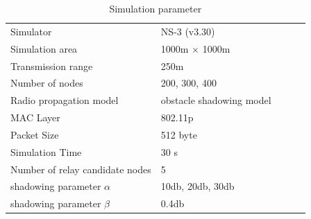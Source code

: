 \documentclass[conference]{IEEEtran}
\begin{document}
\begin{table}[!ht]
\begin{center}
\caption{Simulation parameter}
\label{tab:parameter}
\begin{tabular}{|l|l|lll}
\cline{1-2}
Simulator    & NS-3 (v3.30) &  &  &  \\ \cline{1-2}
Simulation area    & 1000m × 1000m   &  &  &  \\ \cline{1-2}
Transmission range & 250m            &  &  &  \\ \cline{1-2}
Number of nodes & 200, 300, 400      &  &  &  \\ \cline{1-2}
Radio propagation model    & obstacle shadowing model\cite{20}&  &  &  \\ \cline{1-2}
MAC Layer     & 802.11p &  &  &  \\ \cline{1-2}
Packet Size & 512 byte       &  &  &  \\ \cline{1-2}
Simulation Time & 30 s      &  &  &  \\ \cline{1-2}
Number of relay candidate nodes  & 5       &  &  \\ \cline{1-2}
shadowing parameter $\alpha$  & 10db, 20db, 30db       &  &  &  \\ \cline{1-2}
shadowing parameter $\beta$    & 0.4db &  &  \\ \cline{1-2}
\end{tabular}
\end{center}
\end{table}
\end{document}
